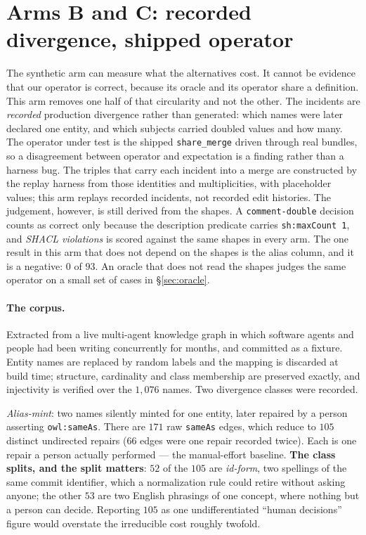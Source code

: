 \section{Arms B and C: recorded divergence, shipped operator}
\label{sec:replay}

The synthetic arm can measure what the alternatives cost. It cannot be evidence
that our operator is correct, because its oracle and its operator share a
definition. This arm removes one half of that circularity and not the other. The
incidents are \emph{recorded} production divergence rather than generated: which
names were later declared one entity, and which subjects carried doubled values
and how many. The operator under test is the shipped \texttt{share\_merge} driven
through real bundles, so a disagreement between operator and expectation is a
finding rather than a harness bug. The triples that carry each incident into a
merge are constructed by the replay harness from those identities and
multiplicities, with placeholder values; this arm replays recorded incidents, not
recorded edit histories. The judgement, however, is still derived from the shapes. A
\texttt{comment-double} decision counts as correct only because the description
predicate carries \texttt{sh:maxCount 1}, and \emph{SHACL violations} is scored
against the same shapes in every arm. The one result in this arm that does not
depend on the shapes is the alias column, and it is a negative: $0$ of $93$.
An oracle that does not read the shapes judges the same operator on a small
set of cases in \S\ref{sec:oracle}.

\paragraph{The corpus.} Extracted from a live multi-agent knowledge graph in
which software agents and people had been writing concurrently for months, and
committed as a fixture. Entity names are replaced by random labels and the
mapping is discarded at build time; structure, cardinality and class membership
are preserved exactly, and injectivity is verified over the $1{,}076$ names.
Two divergence classes were recorded.

\emph{Alias-mint}: two names silently minted for one entity, later repaired by a
person asserting \texttt{owl:sameAs}. There are $171$ raw \texttt{sameAs} edges,
which reduce to $105$ distinct undirected repairs ($66$ edges were one repair
recorded twice). Each is one repair a person actually performed --- the
manual-effort baseline. \textbf{The class splits, and the split matters}: $52$
of the $105$ are \emph{id-form}, two spellings of the same commit identifier,
which a normalization rule could retire without asking anyone; the other $53$
are two English phrasings of one concept, where nothing but a person can decide.
Reporting $105$ as one undifferentiated ``human decisions'' figure would
overstate the irreducible cost roughly twofold.

